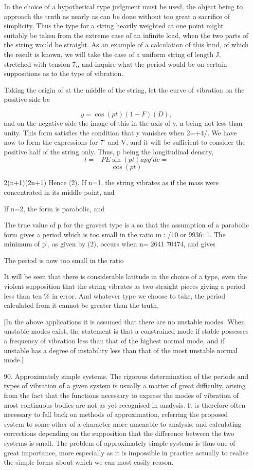 In the choice of a hypothetical type judgment must be used, the object being to
approach the truth as nearly as can be done without too great a sacrifice of
simplicity. Thus the type for a string heavily weighted at one point might
suitably be taken from the extreme case of an infinite load, when the two parts
of the string would be straight. As an example of a calculation of this kind,
of which the result is known, we will take the case of a uniform string of
length J, stretched with tension 7,, and inquire what the period would be on
certain suppositions as to the type of vibration.

Taking the origin of at the middle of the string, let the curve of vibration on
the positive side be

\[y = \cos(pt) (1 - F) (D),\]
and on the negative side the image of this in the
axis of y, n being not less than unity. This form satisfies the condition that
y vanishes when 2=+4/. We have now to form the expressions for 7' and V, and it
will be sufficient to consider the positive half of the string only. Thus, p
being the longitudinal density,
\[t = - P E \sin(pt) a p y' de =\]
\[\cos(pt)\]

2(n+1)(2n+1) Hence (2). If n=1, the string vibrates as if the mass were
concentrated in its middle point, and

If n=2, the form is parabolic, and

The true value of p for the gravest type is a so that the assumption of a
parabolic form gives a period which is too small in the ratio m : /10 or 9936:
1. The minimum of p', as given by (2), occurs when n= 2641 70474, and gives

The period is now too small in the ratio

It will be seen that there is considerable latitude in the choice of a type,
even the violent supposition that the string vibrates as two straight pieces
giving a period less than ten \(\%\) in error. And whatever type we choose to
take, the period calculated from it cannot be greater than the truth,

[In the above applications it is assumed that there are no unstable modes. When
unstable modes exist, the statement is that a constrained mode if stable
possesses a frequency of vibration less than that of the highest normal mode,
and if unstable has a degree of instability less than that of the most unstable
normal mode.]

90.  Approximately simple systems.
The rigorous determination of the periods and types of vibration of a given
system is usually a matter of great difficulty, arising from the fact that the
functions necessary to express the modes of vibration of most continuous bodies
are not as yet recognised in analysis. It is therefore often necessary to fall
back on methods of approximation, referring the proposed system to some other
of a character more amenable to analysis, and calculating corrections depending
on the supposition that the difference between the two systems is small. The
problem of approximately simple systems is thus one of great importance, more
especially as it is impossible in practice actually to realise the simple forms
about which we can most easily reason.

